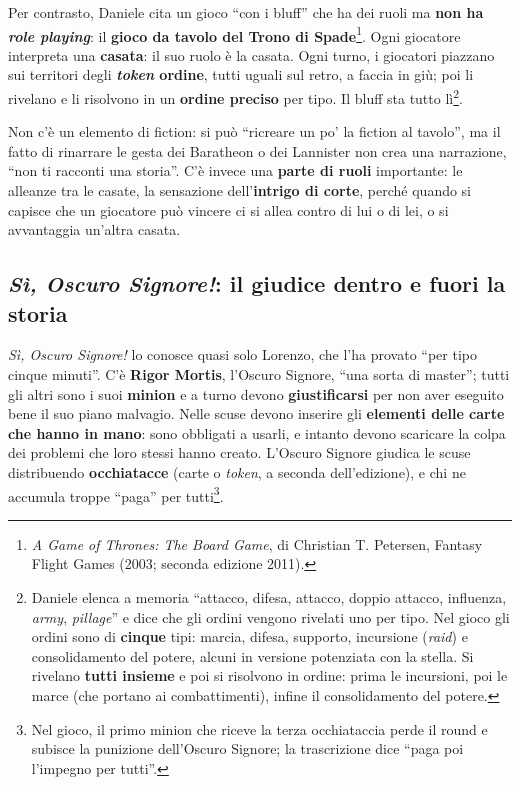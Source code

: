 Per contrasto, Daniele cita un gioco ``con i bluff'' che ha dei ruoli ma \textbf{non ha
\emph{role playing}}: il \textbf{gioco da tavolo del Trono di Spade}\footnote{\emph{A Game of
Thrones: The Board Game}, di Christian T. Petersen, Fantasy Flight Games (2003; seconda edizione
2011).}. Ogni giocatore interpreta una \textbf{casata}: il suo ruolo è la casata. Ogni turno, i
giocatori piazzano sui territori degli \textbf{\emph{token} ordine}, tutti uguali sul retro, a
faccia in giù; poi li rivelano e li risolvono in un \textbf{ordine preciso} per tipo. Il bluff
sta tutto lì\footnote{Daniele elenca a memoria ``attacco, difesa, attacco, doppio attacco,
influenza, \emph{army}, \emph{pillage}'' e dice che gli ordini vengono rivelati uno per tipo.
Nel gioco gli ordini sono di \textbf{cinque} tipi: marcia, difesa, supporto, incursione
(\emph{raid}) e consolidamento del potere, alcuni in versione potenziata con la stella. Si
rivelano \textbf{tutti insieme} e poi si risolvono in ordine: prima le incursioni, poi le
marce (che portano ai combattimenti), infine il consolidamento del potere.}.

Non c'è un elemento di fiction: si può ``ricreare un po' la fiction al tavolo'', ma il fatto di
rinarrare le gesta dei Baratheon o dei Lannister non crea una narrazione, ``non ti racconti una
storia''. C'è invece una \textbf{parte di ruoli} importante: le alleanze tra le casate, la
sensazione dell'\textbf{intrigo di corte}, perché quando si capisce che un giocatore può vincere
ci si allea contro di lui o di lei, o si avvantaggia un'altra casata.

\subsection{\emph{Sì, Oscuro Signore!}: il giudice dentro e fuori la storia}



\emph{Sì, Oscuro Signore!} lo conosce quasi solo Lorenzo, che l'ha provato ``per tipo cinque
minuti''. C'è \textbf{Rigor Mortis}, l'Oscuro Signore, ``una sorta di master''; tutti gli altri
sono i suoi \textbf{minion} e a turno devono \textbf{giustificarsi} per non aver eseguito bene
il suo piano malvagio. Nelle scuse devono inserire gli \textbf{elementi delle carte che hanno in
mano}: sono obbligati a usarli, e intanto devono scaricare la colpa dei problemi che loro stessi
hanno creato. L'Oscuro Signore giudica le scuse distribuendo \textbf{occhiatacce} (carte o
\emph{token}, a seconda dell'edizione), e chi ne accumula troppe ``paga'' per
tutti\footnote{Nel gioco, il primo minion che riceve la terza occhiataccia perde il round e
subisce la punizione dell'Oscuro Signore; la trascrizione dice ``paga poi l'impegno per
tutti''.}.

